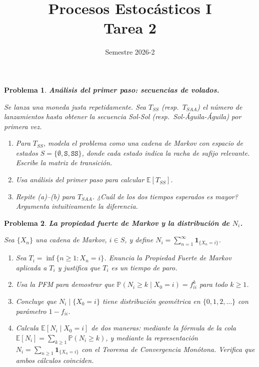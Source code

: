 \documentclass[12pt]{article}
\title{Procesos Estocásticos I \\ Tarea 2}
\author{Semestre 2026-2}
\date{}
\newtheorem{problem}{Problema}
\begin{document}
\maketitle

\begin{problem}
\textbf{Análisis del primer paso: secuencias de volados.}

Se lanza una moneda justa repetidamente. Sea $T_{SS}$ (resp.\ $T_{SAA}$) el número de lanzamientos hasta obtener la secuencia Sol-Sol (resp.\ Sol-Águila-Águila) por primera vez.

\begin{enumerate}
    \item[(a)] Para $T_{SS}$, modela el problema como una cadena de Markov con espacio de estados $S = \{\emptyset, \texttt{S}, \texttt{SS}\}$, donde cada estado indica la racha de sufijo relevante. Escribe la matriz de transición.

    \item[(b)] Usa análisis del primer paso para calcular $\mathbb{E}[T_{SS}]$.

    \item[(c)] Repite (a)--(b) para $T_{SAA}$. ¿Cuál de los dos tiempos esperados es mayor? Argumenta intuitivamente la diferencia.
\end{enumerate}
\end{problem}

\begin{problem}
\textbf{La propiedad fuerte de Markov y la distribución de $N_i$.}

Sea $\{X_n\}$ una cadena de Markov, $i \in S$, y define $N_i = \sum_{n=1}^{\infty} \mathbf{1}_{\{X_n = i\}}$.

\begin{enumerate}
    \item[(a)] Sea $T_i = \inf\{n \ge 1 : X_n = i\}$. Enuncia la Propiedad Fuerte de Markov aplicada a $T_i$ y justifica que $T_i$ es un tiempo de paro.

    \item[(b)] Usa la PFM para demostrar que $\mathbb{P}(N_i \ge k \mid X_0 = i) = f_{ii}^k$ para todo $k \ge 1$.

    \item[(c)] Concluye que $N_i \mid \{X_0 = i\}$ tiene distribución geométrica en $\{0, 1, 2, \ldots\}$ con parámetro $1 - f_{ii}$.

    \item[(d)] Calcula $\mathbb{E}[N_i \mid X_0 = i]$ de dos maneras: mediante la fórmula de la cola $\mathbb{E}[N_i] = \sum_{k \ge 1} \mathbb{P}(N_i \ge k)$, y mediante la representación $N_i = \sum_{n \ge 1} \mathbf{1}_{\{X_n=i\}}$ con el Teorema de Convergencia Monótona. Verifica que ambos cálculos coinciden.
\end{enumerate}
\end{problem}
\end{document}

